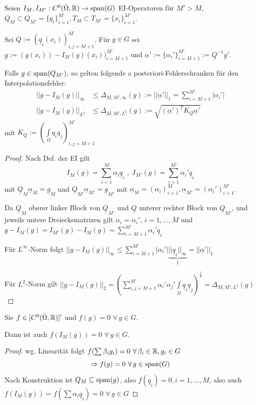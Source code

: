 \begin{satz} \label{4.5}
Seien $I_M, I_{M'}: C^0 (\bar{\Omega},\mathbb{R}) \rightarrow \operatorname{span} (G)$ EI-Operatoren für $M' > M$, $Q_M \subset Q_{M'} = \{q_i\}_{i=1}^{M'}, T_M \subset T_{M'} = \{x_i\}_{i=1}^{M'}$.

Sei $\underline{Q} := (\underline{q}_i(x_i))_{i,j=M+1}^{M'}$. Für $g \in G$ sei $\underline{g} := (g(x_i)) - I_M(g)(x_i))_{i=M+1}^{M'}$ und $\underline{\alpha}' := \{\alpha_i '\}_{i=M+1}^{M'} := \underline{Q}^{-1} \underline{g}'.$

Falls $g \in \operatorname{span}(Q_{M'}),$ so gelten folgende a posteriori-Fehlerschranken für den Interpolationsfehler:
\begin{align*}
||g-I_M(g)||_{\infty} &\leq \Delta_{M,M',\infty} (g) := ||\underline{\alpha}'||_1 = \sum\limits_{i=M+1}^{M'}|\alpha_i '| \\
||g-I_M(g)||_{L^2} &\leq \Delta_{M,M', L^2} (g) := \sqrt{(\underline{\alpha}')^T K_Q \underline{\alpha}'}
\end{align*}
mit $K_Q := (\int\limits_{\Omega} q_i q_j)_{i,j=M+1}^{M'}$
\begin{proof}
Nach Def. der EI gilt
\[
	I_M(g) = \sum\limits_{i=1}^M \alpha_i \underline{q}_i \,\, , \,\, I_{M'}(g) = \sum\limits_{i=1}^{M'} \alpha_i ' \underline{q}_i
\]
mit $\underline{Q}_M \underline{\alpha}_M = \underline{g}_M$ und $\underline{Q}_{M'} \underline{\alpha}_{M'} = \underline{g}_{M'}$
mit $\underline{\alpha}_M = (\alpha_i)_{i=1}^M, \underline{\alpha}_{M'} = (\alpha_i ')_{i=1}^{M'}$.

Da $\underline{Q}_M$ oberer linker Block von $\underline{Q}_{M'}$ und $\underline{Q}$ unterer rechter Block von $\underline{Q}_{M'}$, und jeweils untere Dreiecksmatrizen gilt $\alpha_i = \alpha_i '$, $i=1,\dots,M$ und $g-I_M(g) = I_{M'}(g) - I_M(g) = \sum\limits_{i=M+1}^{M'} \alpha_i ' \underline{q}_i$

Für $L^{\infty}$-Norm folgt $||g-I_M(g)||_{\infty} \leq \sum\limits_{i=M+1}^{M'} | \alpha_i ' | \underbrace{||\underline{q}_i||_{\infty}}_{1} = ||\underline{\alpha}'||_1$

Für $L^2$-Norm gilt $||g-I_M(g)||_{2} = \left(\sum\limits_{i,j=M+1}^{M'} \alpha_i ' \alpha_j ' \int\limits_{\bar{\Omega}} \underline{q}_i \underline{q}_j \right)^{\frac{1}{2}} = \Delta_{M,M',L^2}(g)$
\end{proof}
\end{satz}

\begin{satz}[Erhaltungseigenschaft]
Sie $f \in [C^0(\bar{\Omega},\mathbb{R})]'$ und $f(g) = 0 \,\, \forall \, g \in G$.

Dann ist auch $f(I_M(g)) = 0 \,\, \forall \, g \in G$.
\begin{proof}
wg. Linearität folgt $f(\sum \beta_i g_i) = 0 \,\, \forall \, \beta_i \in \mathbb{R}, g_i \in G$
\[
	\Rightarrow f(g) = 0 \,\, \forall \, g \in \operatorname{span}(G)
\]
Nach Konstruktion ist $Q_M \subseteq \operatorname{span}(g)$, also $f(\underline{q}_i) = 0, i=1,\dots,M$, also auch $f(I_M(g)) = f(\sum \alpha_i \underline{q}_i) = 0 \,\, \forall \, g \in G$
\end{proof}
\end{satz}

